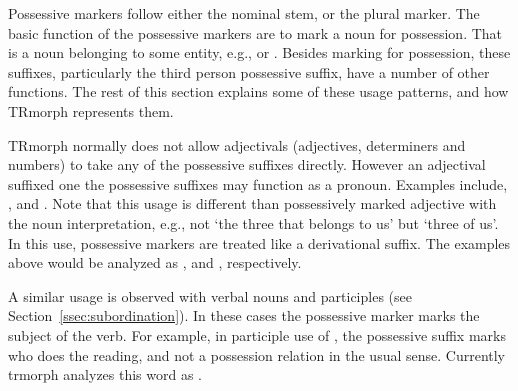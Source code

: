 \documentclass[twocolumn]{article}
\begin{document}
Possessive markers follow either the nominal stem, or the plural marker. 
The basic function of the possessive markers are to mark a noun for possession.
That is a noun belonging to some entity, e.g.,  or .
Besides marking for possession, 
these suffixes, particularly the third person possessive suffix, 
have a number of other functions. 
The rest of this section explains some of these usage patterns, 
and how TRmorph represents them.

TRmorph normally does not allow adjectivals (adjectives, determiners and numbers) to take any of the possessive suffixes directly.
However an adjectival suffixed one the possessive suffixes may function as a pronoun. 
Examples include, 
, 
 and
.
Note that this usage is different than possessively marked adjective 
with the noun interpretation, 
e.g., not `the three that belongs to us' but `three of us'.
In this use, possessive markers are treated like a derivational suffix.
The examples above would be analyzed as 
,
 and
,
respectively.


A similar usage is observed with verbal nouns and participles (see Section~\ref{ssec:subordination}).
In these cases the possessive marker marks the subject of the verb.
For example, in participle use of 
,
the possessive suffix marks who does the reading, 
and not a possession relation in the usual sense.
Currently trmorph analyzes this word as
.
\end{document}
